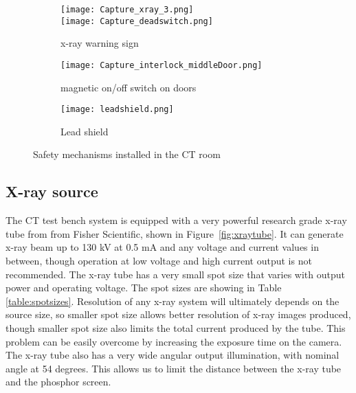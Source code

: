 \begin{figure}[h]
	\centering
	\begin{subfigure}[b]{0.3\linewidth}
	\texttt{[image: Capture\_xray\_3.png]} \\
	\vspace{0.2cm}
	\texttt{[image: Capture\_deadswitch.png]}
	\caption{x-ray warning sign}
	\label{fig:xraywarningsign}
	\end{subfigure}
\hspace{0.2cm}
	\begin{subfigure}[b]{0.3\linewidth}
	\centering
	\texttt{[image: Capture\_interlock\_middleDoor.png]}
	\caption{magnetic on/off switch on doors}
	\label{fig:doorinterlock}
	\end{subfigure}
\hspace{0.2cm}
	\begin{subfigure}[b]{0.3\linewidth}
	\centering
	\texttt{[image: leadshield.png]}
	\caption{Lead shield}
	\label{fig:leadshield}
	\end{subfigure}
\caption{Safety mechanisms installed in the CT room}
\label{fig:safety}
\end{figure}













\subsection{X-ray source}
The CT test bench system is equipped with a very powerful research grade x-ray tube from from Fisher Scientific, shown in Figure~\ref{fig:xraytube}.  It can generate x-ray beam up to 130 kV at 0.5 mA and any voltage and current values in between, though operation at low voltage and high current output is not recommended.  The x-ray tube has a very small spot size that varies with output power and operating voltage.  The spot sizes are showing in Table \ref{table:spotsizes}.  Resolution of any x-ray system will ultimately depends on the source size, so smaller spot size allows better resolution of x-ray images produced, though smaller spot size also limits the total current produced by the tube.  This problem can be easily overcome by increasing the exposure time on the camera.  The x-ray tube also has a very wide angular output illumination, with nominal angle at 54 degrees.  This allows us to limit the distance between the x-ray tube and the phosphor screen.

